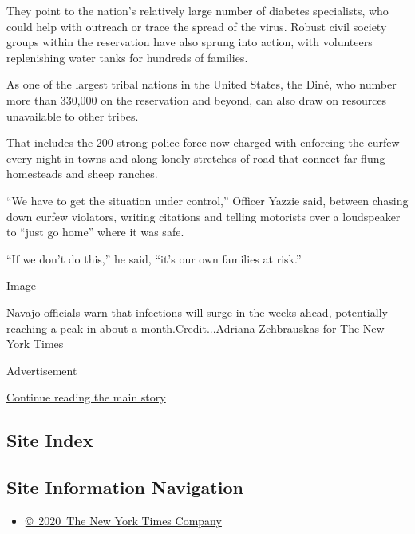 They point to the nation's relatively large number of diabetes
specialists, who could help with outreach or trace the spread of the
virus. Robust civil society groups within the reservation have also
sprung into action, with volunteers replenishing water tanks for
hundreds of families.

As one of the largest tribal nations in the United States, the Diné, who
number more than 330,000 on the reservation and beyond, can also draw on
resources unavailable to other tribes.

That includes the 200-strong police force now charged with enforcing the
curfew every night in towns and along lonely stretches of road that
connect far-flung homesteads and sheep ranches.

``We have to get the situation under control,'' Officer Yazzie said,
between chasing down curfew violators, writing citations and telling
motorists over a loudspeaker to ``just go home'' where it was safe.

``If we don't do this,'' he said, ``it's our own families at risk.''

Image

Navajo officials warn that infections will surge in the weeks ahead,
potentially reaching a peak in about a month.Credit...Adriana
Zehbrauskas for The New York Times

Advertisement

\protect\hyperlink{after-bottom}{Continue reading the main story}

\hypertarget{site-index}{%
\subsection{Site Index}\label{site-index}}

\hypertarget{site-information-navigation}{%
\subsection{Site Information
Navigation}\label{site-information-navigation}}

\begin{itemize}
\tightlist
\item
  \href{https://help.nytimes.com/hc/en-us/articles/115014792127-Copyright-notice}{©~2020~The
  New York Times Company}
\end{itemize}

